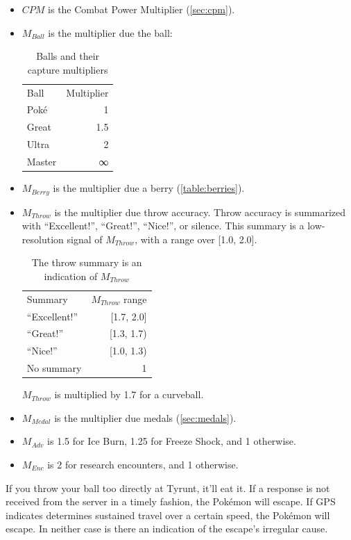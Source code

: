 \begin{itemize}
  \item $CPM$ is the Combat Power Multiplier (\autoref{sec:cpm}).
  \item $M_{Ball}$ is the multiplier due the ball:
\begin{table}[h!]
\centering
\begin{tabular}{lr}
Ball & Multiplier\\
\Midrule
Poké & 1\\
Great & 1.5\\
Ultra & 2\\
Master & ∞\\
\end{tabular}
\caption{Balls and their capture multipliers}
\label{table:balls}
\end{table}
\item $M_{Berry}$ is the multiplier due a berry (\autoref{table:berries}).
\item $M_{Throw}$ is the multiplier due throw accuracy. Throw accuracy is summarized
   with ``Excellent!'', ``Great!'', ``Nice!'', or silence.
    This summary is a low-resolution signal of $M_{Throw}$, with a range over [1.0, 2.0].
\begin{table}[h!]
\centering
\begin{tabular}{lr}
Summary & $M_{Throw}$ range\\
\Midrule
``Excellent!'' & [1.7, 2.0]\\
``Great!'' & [1.3, 1.7)\\
``Nice!'' & [1.0, 1.3)\\
No summary & 1\\
\end{tabular}
\caption{The throw summary is an indication of $M_{Throw}$}
\label{table:throw}
\end{table}
$M_{Throw}$ is multiplied by 1.7 for a curveball.
\item $M_{Medal}$ is the multiplier due medals (\autoref{sec:medals}).
\item $M_{Adv}$ is 1.5 for Ice Burn, 1.25 for Freeze Shock, and 1 otherwise.
\item $M_{Enc}$ is 2 for research encounters, and 1 otherwise.
\end{itemize}
If you throw your ball too directly at Tyrunt, it'll eat it.
If a response is not received from the server in a timely fashion, the Pokémon will escape.
If GPS indicates determines sustained travel over a certain speed, the Pokémon will escape.
In neither case is there an indication of the escape's irregular cause.

